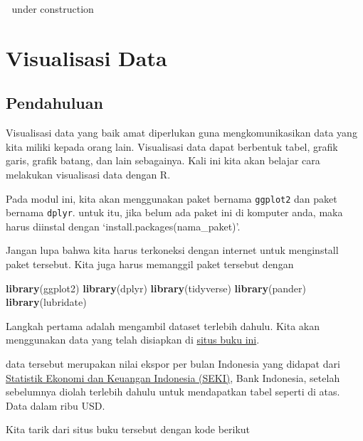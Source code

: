 \documentclass[
]{book}
\newenvironment{Shaded}{\begin{snugshade}}{\end{snugshade}}
\newcommand{\CommentTok}[1]{\textcolor[rgb]{0.56,0.35,0.01}{\textit{#1}}}
\newcommand{\KeywordTok}[1]{\textcolor[rgb]{0.13,0.29,0.53}{\textbf{#1}}}
\newcommand{\NormalTok}[1]{#1}
\newcommand{\OperatorTok}[1]{\textcolor[rgb]{0.81,0.36,0.00}{\textbf{#1}}}
\newcommand{\StringTok}[1]{\textcolor[rgb]{0.31,0.60,0.02}{#1}}
\begin{document}
🚧 under construction 🚧

\hypertarget{visualisasi-data}{%
\chapter{Visualisasi Data}\label{visualisasi-data}}

\hypertarget{pendahuluan}{%
\section{Pendahuluan}\label{pendahuluan}}

Visualisasi data yang baik amat diperlukan guna mengkomunikasikan data yang kita miliki kepada orang lain. Visualisasi data dapat berbentuk tabel, grafik garis, grafik batang, dan lain sebagainya. Kali ini kita akan belajar cara melakukan visualisasi data dengan R.

Pada modul ini, kita akan menggunakan paket bernama \texttt{ggplot2} dan paket bernama \texttt{dplyr}. untuk itu, jika belum ada paket ini di komputer anda, maka harus diinstal dengan `install.packages(nama\_paket)'.

Jangan lupa bahwa kita harus terkoneksi dengan internet untuk menginstall paket tersebut. Kita juga harus memanggil paket tersebut dengan

\begin{Shaded}
\begin{Highlighting}[]
\KeywordTok{library}\NormalTok{(ggplot2)}
\KeywordTok{library}\NormalTok{(dplyr)}
\KeywordTok{library}\NormalTok{(tidyverse)}
\KeywordTok{library}\NormalTok{(pander)}
\KeywordTok{library}\NormalTok{(lubridate)}
\end{Highlighting}
\end{Shaded}

Langkah pertama adalah mengambil dataset terlebih dahulu. Kita akan menggunakan data yang telah disiapkan di \href{https://imedkrisna.github.io/r/docs/index.html}{situs buku ini}.

data tersebut merupakan nilai ekspor per bulan Indonesia yang didapat dari \href{https://www.bi.go.id/id/statistik/seki/terkini/eksternal/Contents/Default.aspx}{Statistik Ekonomi dan Keuangan Indonesia (SEKI)}, Bank Indonesia, setelah sebelumnya diolah terlebih dahulu untuk mendapatkan tabel seperti di atas. Data dalam ribu USD.

Kita tarik dari situs buku tersebut dengan kode berikut

\begin{Shaded}
\end{Shaded}
\end{document}
